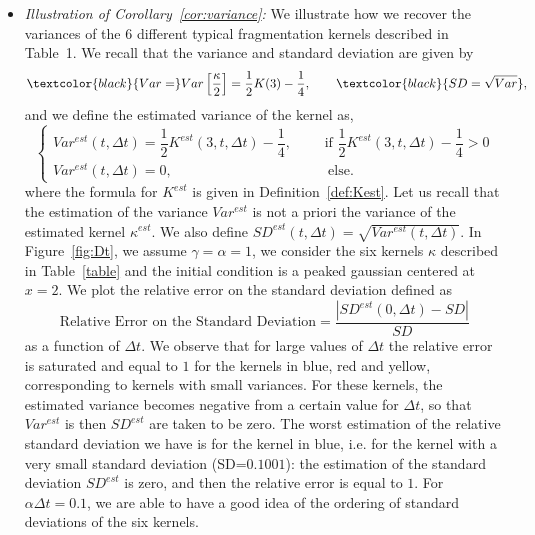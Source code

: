 \documentclass[AHL,Unicode,longabstracts,published]{cedram}
\newcommand{\Mag}[1]{\textcolor{black}{#1}}
\begin{document}
\begin{itemize}
\item \emph{Illustration of Corollary~\ref{cor:variance}:\;} We illustrate how we recover the variances of the 6 different typical fragmentation kernels described in Table~1. We recall that the variance and standard deviation are given by
\begin{equation*}
\Mag{Var=} Var\left[\dfrac{\kappa}{2}\right] =\dfrac{1}{2}K(3)- \dfrac{1}{4}, \qquad \Mag{SD=\sqrt{Var}},
\end{equation*}
and we define the estimated variance of the kernel as,
\begin{equation*}
\begin{cases}
Var^{est}(t,\Delta t)=\dfrac{1}{2}K^{est}(3,t,\Delta t)- \dfrac{1}{4}, \qquad \text{ if }\dfrac{1}{2}K^{est}(3,t,\Delta t)- \dfrac{1}{4}>0\\
Var^{est}(t,\Delta t)=0, \qquad \qquad \qquad\hspace{2cm} \text{ else.}
\end{cases}
\end{equation*}
where the formula for $K^{est}$ is given in Definition~\ref{def:Kest}. Let us recall that the estimation of the variance $Var^{est}$ is not a priori the variance of the estimated kernel $\kappa^{est}$. We also define $SD^{est}(t,\Delta t)=\sqrt{Var^{est}(t,\Delta t)}$. In Figure~\ref{fig:Dt}, we assume $\gamma=\alpha=1$, we consider the six kernels $\kappa$ described in Table~\ref{table} and the initial condition is a peaked gaussian centered at $x=2$. We plot the relative error on the standard deviation defined as
\begin{equation*}
\text{Relative Error on the Standard Deviation}= \dfrac{|SD^{est}(0,\Delta t) - SD|}{{SD}}
\end{equation*}
as a function of $\Delta t$. We observe that for large values of $\Delta t$ the relative error is saturated and equal to $1$ for the kernels in blue, red and yellow, corresponding to kernels with small variances. For these kernels, the estimated variance becomes negative from a certain value for $\Delta t$, so that $Var^{est}$ is then $SD^{est}$ are taken to be zero. The worst estimation of the relative standard deviation we have is for the kernel in blue, i.e. for the kernel with a very small standard deviation (SD=$0.1001$): the estimation of the standard deviation $SD^{est}$ is zero, and then the relative error is equal to $1$. For $\alpha \Delta t=0.1$, we are able to have a good idea of the ordering of standard deviations of the six kernels.
\end{itemize}
\end{document}
